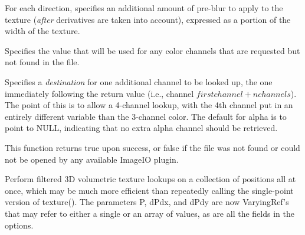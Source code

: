 \vspace{-24pt}
\vspace{10pt}
For each direction, specifies an additional amount of pre-blur to apply
to the texture (\emph{after} derivatives are taken into account),
expressed as a portion of the width of the texture.
\apiend

\vspace{-24pt}
\vspace{10pt}
Specifies the value that will be used for any color channels that are
requested but not found in the file.
\apiend

\vspace{-24pt}
\vspace{10pt}
Specifies a \emph{destination} for one additional channel to be looked
up, the one immediately following the return value (i.e., channel
$\mathit{firstchannel}+\mathit{nchannels}$).  The point of this is to
allow a 4-channel lookup, with the 4th channel put in an entirely
different variable than the 3-channel color.  The default for {\cf
  alpha} is to point to NULL, indicating that no extra alpha channel
should be retrieved.
\apiend

This function returns {\cf true} upon success, or {\cf false} if the
file was not found or could not be opened by any available ImageIO
plugin.

\apiend


Perform filtered 3D volumetric texture lookups on a collection of positions all at
once, which may be much more efficient than repeatedly calling the
single-point version of {\cf texture()}.  The parameters {\cf P},
{\cf dPdx}, and {\cf dPdy} are now
{\cf VaryingRef}'s that may refer to either a single or an array of
values, as are all the fields in the {\cf options}.

